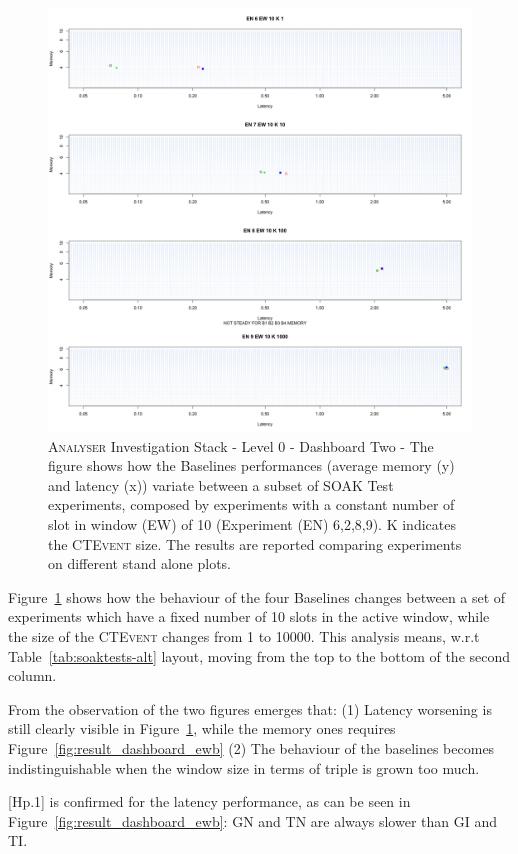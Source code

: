 \begin{figure}[h|tbp]
	\centering
	\includegraphics[width=0.80\linewidth]{images/dashboard-2-split}	
	\caption[\textsc{Analyser} Investigation Stack - Level 0 - Dashboard Two - Split Version]{\textsc{Analyser} Investigation Stack - Level 0 - Dashboard Two - The figure shows how the Baselines performances (average memory (y) and latency (x))  variate between a subset of SOAK Test experiments, composed by experiments with a constant number of slot in window (EW) of 10 (Experiment (EN) 6,2,8,9). K indicates the \textsc{CTEvent} size. The results are reported comparing experiments on different stand alone plots.}
	\label{fig:result_dashboard_ewa}
\end{figure}




Figure~\ref{fig:result_dashboard_ewa} shows how the behaviour of the four Baselines changes between a set of experiments which have a fixed number of 10 slots in the active window, while the size of the \textsc{CTEvent} changes from 1 to 10000. This analysis means, w.r.t Table~\ref{tab:soaktests-alt} layout, moving from the top to the bottom of the second column.

From the observation of the two figures emerges that: (1) Latency worsening is still clearly visible in Figure~\ref{fig:result_dashboard_ewa}, while the memory ones requires Figure~\ref{fig:result_dashboard_ewb} (2) The behaviour of the baselines becomes indistinguishable when the window size in terms of triple is grown too much. 

[Hp.1] is confirmed for the latency performance, as can be seen in Figure~\ref{fig:result_dashboard_ewb}: GN and TN are always slower than GI and TI. 

